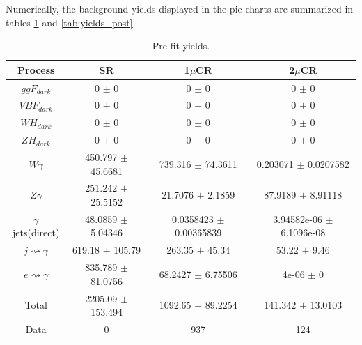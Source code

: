 \vspace{1 cm}

\noindent
Numerically, the background yields displayed in the pie charts are summarized in tables \ref{tab:yields_pre} and \ref{tab:yields_post}.

\begin{table}[h!]
    \centering
    \begin{tabular}{|c|c|c|c|}
    \hline
       \textbf{Process}  & \textbf{SR} & \textbf{1$\mu$CR} & \textbf{2$\mu$CR} \\
    \hline
    $ggF_{dark}$ & 0 $\pm$ 0& 0 $\pm$ 0 & 0 $\pm$ 0\\
    \hline
     $VBF_{dark}$  & 0 $\pm$ 0 & 0 $\pm$ 0 & 0 $\pm$ 0 \\
    \hline
      $WH_{dark}$ & 0 $\pm$ 0 & 0 $\pm$ 0 & 0 $\pm$ 0 \\
    \hline
      $ZH_{dark}$ & 0 $\pm$ 0 & 0 $\pm$ 0 & 0 $\pm$ 0 \\
    \hline
      $W\gamma$ & 450.797 $\pm$ 45.6681& 739.316 $\pm$ 74.3611& 0.203071 $\pm$ 0.0207582\\
    \hline
      $Z\gamma$ & 251.242 $\pm$ 25.5152& 21.7076 $\pm$ 2.1859& 87.9189 $\pm$ 8.91118\\
    \hline
      $\gamma$jets(direct) &48.0859 $\pm$ 5.04346 &0.0358423 $\pm$ 0.00365839 & 3.94582e-06 $\pm$ 6.1096e-08\\
    \hline
     $j \rightsquigarrow \gamma$  &619.18 $\pm$ 105.79 & 263.35 $\pm$ 45.34& 53.22 $\pm$ 9.46\\
    \hline
     $e \rightsquigarrow \gamma$  & 835.789 $\pm$ 81.0756& 68.2427 $\pm$ 6.75506& 4e-06 $\pm$ 0\\
    \hline
     Total  &2205.09 $\pm$ 153.494 & 1092.65 $\pm$ 89.2254& 141.342 $\pm$ 13.0103\\
    \hline
     Data  & 0 & 937& 124\\
    \hline
    
    \end{tabular}
    \caption{Pre-fit yields.}
    \label{tab:yields_pre}
\end{table}


